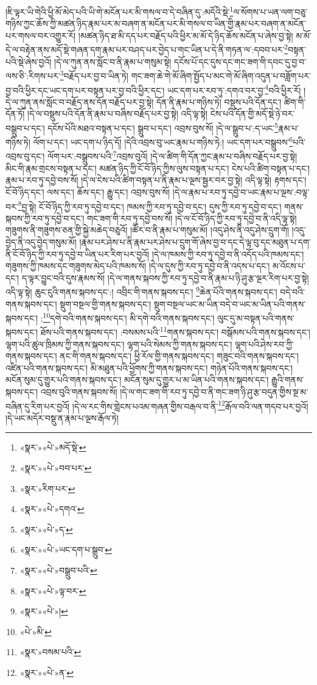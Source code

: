།ཇི་ལྟར་ཡི་གེའི་ཕྱི་མོ་མེད་པའི་ཡི་གེ་མངོན་པར་མི་གསལ་བ་དེ་བཞིན་དུ་:མདོའི་སྡེ་\footnote{«སྣར་»«པེ་»མདོ་སྡེ་}ལ་སོགས་པ་ཡན་ལག་བཅུ་གཉིས་ཀྱང་ཆོས་ཀྱི་མཚན་ཉིད་རྣམ་པར་མ་བཞག་ན་མངོན་པར་མི་གསལ་བ་ཡིན་གྱི་རྣམ་པར་བཞག་ན་མངོན་པར་གསལ་བར་འགྱུར་རོ། །མཚན་ཉིད་ཐ་མི་དད་པར་བརྗོད་པའི་ཕྱིར་མ་མོ་དེ་ཉིད་ཆོས་མངོན་པ་ཞེས་བྱ་སྟེ། མ་མོ་དེ་ལ་བརྟེན་ནས་མདོ་སྡེ་གཞན་དག་རྣམ་པར་བཤད་པར་བྱེད་པ་གང་ཡིན་པ་དེ་ནི་གཏན་ལ་:དབབ་པར་\footnote{«སྣར་»«པེ་»བབ་པར་}བསྟན་པའི་སྡེ་ཞེས་བྱའོ། །དེ་ལ་ཀུན་ནས་སློང་བ་ནི་རྣམ་པ་གསུམ་སྟེ། དངོས་པོ་དང་དུས་དང་གང་ཟག་གི་དབང་དུ་བྱ་བ་ལས་ཅི་:རིགས་པར་\footnote{«སྣར་»རིག་པར་}བརྗོད་པར་བྱ་བ་ཡིན་ཏེ། གང་ཟག་ཆེ་གེ་མོ་ཞིག་སྤྱོད་པ་མང་གེ་མོ་ཞིག་འདུན་པ་བཟློག་པར་བྱ་བའི་ཕྱིར་དང་ཡང་དག་པར་བསྟན་པར་བྱ་བའི་ཕྱིར་དང་། ཡང་དག་པར་རབ་ཏུ་:དགའ་བར་བྱ་\footnote{«སྣར་»«པེ་»དགའ་}བའི་ཕྱིར་རོ། །དེ་ལ་ཀུན་ནས་སློང་བ་བརྗོད་ནས་དོན་བརྗོད་པར་བྱ་སྟེ། དོན་ནི་རྣམ་པ་གཉིས་ཏེ། བསྡུས་པའི་དོན་དང་། ཚིག་གི་དོན་ཏོ། །དེ་ལ་བསྡུས་པའི་དོན་ནི་རྣམ་པ་བཞིས་བརྗོད་པར་བྱ་སྟེ། འདི་ལྟ་སྟེ། ངེས་པའི་དོན་གྱི་མདོ་སྡེ་ཉེ་བར་བསྒྲུབ་པ་དང་། དངོས་པོའི་མཐའ་བསྟན་པ་དང་། སྒྲུབ་པ་དང་། འབྲས་བུས་སོ། །དེ་ལ་སྒྲུབ་པ་:ད་ཡང་\footnote{«སྣར་»«པེ་»ད་}རྣམ་པ་གཉིས་ཏེ། ལོག་པ་དང་། ཡང་དག་པ་ཉིད་དོ། །དེའི་འབྲས་བུ་ཡང་རྣམ་པ་གཉིས་ཏེ:། ཡང་དག་པར་བསྒྲུབས་\footnote{«སྣར་»«པེ་»ཡང་དག་པ་སྒྲུབ་}པའི་འབྲས་བུ་དང་། ལོག་པར་:བསྒྲུབས་པའི་\footnote{«སྣར་»«པེ་»བསྒྲུབ་པའི་}འབྲས་བུའོ། །དེ་ལ་ཚིག་གི་དོན་ཀྱང་རྣམ་པ་བཞིས་བརྗོད་པར་བྱ་སྟེ། མིང་གི་རྣམ་གྲངས་བསྟན་པ་དང་། མཚན་ཉིད་ཀྱི་ངོ་བོ་ཉིད་ཀྱིས་ལུས་བསྟན་པ་དང་། ངེས་པའི་ཚིག་བསྟན་པ་དང་། རྣམ་པ་རབ་ཏུ་དབྱེ་བས་སོ། །དེ་ལ་ངེས་པའི་ཚིག་བསྟན་པ་ནི་རྣམ་པ་ལྔས་སྦྱར་བར་བྱ་སྟེ། འདི་ལྟ་སྟེ། རྟགས་དང་། ངོ་བོ་ཉིད་དང་། ལས་དང་། ཆོས་དང་། རྒྱུ་དང་། འབྲས་བུས་སོ། །དེ་ལ་རྣམ་པ་རབ་ཏུ་དབྱེ་བ་ཡང་རྣམ་པ་ལྔས་:བལྟ་བར་\footnote{«སྣར་»«པེ་»ལྟ་བར་}བྱ་སྟེ། ངོ་བོ་ཉིད་ཀྱི་རབ་ཏུ་དབྱེ་བ་དང་། ཁམས་ཀྱི་རབ་ཏུ་དབྱེ་བ་དང་། དུས་ཀྱི་རབ་ཏུ་དབྱེ་བ་དང་། གནས་སྐབས་ཀྱི་རབ་ཏུ་དབྱེ་བ་དང་། གང་ཟག་གི་རབ་ཏུ་དབྱེ་བས་སོ། །དེ་ལ་ངོ་བོ་ཉིད་ཀྱི་རབ་ཏུ་དབྱེ་བ་ནི་འདི་ལྟ་སྟེ། གཟུགས་ནི་གཟུགས་ཅན་གྱི་སྐྱེ་མཆེད་བཅུའོ། །ཚོར་བ་ནི་རྣམ་པ་གསུམ་མོ། །འདུ་ཤེས་ནི་འདུ་ཤེས་དྲུག་གོ། །འདུ་བྱེད་ནི་འདུ་བྱེད་གསུམ་མོ། །རྣམ་པར་ཤེས་པ་ནི་རྣམ་པར་ཤེས་པ་དྲུག་གོ་ཞེས་བྱ་བ་དང་དེ་ལྟ་བུ་དང་མཐུན་པ་དག་ནི་ངོ་བོ་ཉིད་ཀྱི་རབ་ཏུ་དབྱེ་བ་ཡིན་པར་རིག་པར་བྱའོ། །དེ་ལ་ཁམས་ཀྱི་རབ་ཏུ་དབྱེ་བ་ནི་འདོད་པའི་ཁམས་དང་། གཟུགས་ཀྱི་ཁམས་དང་གཟུགས་མེད་པའི་ཁམས་སོ། །དེ་ལ་དུས་ཀྱི་རབ་ཏུ་དབྱེ་བ་ནི་འདས་པ་དང་། མ་འོངས་པ་དང་། ད་ལྟར་བྱུང་བའི་དུས་རྣམས་སོ། །དེ་ལ་གནས་སྐབས་ཀྱི་རབ་ཏུ་དབྱེ་བ་ནི་རྣམ་པ་ཉི་ཤུ་རྩ་ལྔར་རིག་པར་བྱ་སྟེ། འདི་ལྟ་སྟེ། ཆུང་ངུའི་གནས་སྐབས་དང་:། འབྲིང་གི་གནས་སྐབས་དང་། \footnote{«སྣར་»«པེ་»།  }ཆེན་པོའི་གནས་སྐབས་དང་། བདེ་བའི་གནས་སྐབས་དང་། སྡུག་བསྔལ་གྱི་གནས་སྐབས་དང་། སྡུག་བསྔལ་ཡང་མ་ཡིན་བདེ་བ་ཡང་མ་ཡིན་པའི་གནས་སྐབས་དང་། :\footnote{«པེ་»མི་}དགེ་བའི་གནས་སྐབས་དང་། མི་དགེ་བའི་གནས་སྐབས་དང་། ལུང་དུ་མ་བསྟན་པའི་གནས་སྐབས་དང་། ཐོས་པའི་གནས་སྐབས་དང་། :བསམས་པའི་\footnote{«སྣར་»བསམ་པའི་}གནས་སྐབས་དང་། བསྒོམས་པའི་གནས་སྐབས་དང་། ལྷག་པའི་ཚུལ་ཁྲིམས་ཀྱི་གནས་སྐབས་དང་། ལྷག་པའི་སེམས་ཀྱི་གནས་སྐབས་དང་། ལྷག་པའི་ཤེས་རབ་ཀྱི་གནས་སྐབས་དང་། ནང་གི་གནས་སྐབས་དང་། ཕྱི་རོལ་གྱི་གནས་སྐབས་དང་། གཟུང་བའི་གནས་སྐབས་དང་། འཛིན་པའི་གནས་སྐབས་དང་། མི་མཐུན་པའི་ཕྱོགས་ཀྱི་གནས་སྐབས་དང་། གཉེན་པོའི་གནས་སྐབས་དང་། མངོན་སུམ་དུ་གྱུར་པའི་གནས་སྐབས་དང་། མངོན་སུམ་དུ་གྱུར་པ་མ་ཡིན་པའི་གནས་སྐབས་དང་། རྒྱུའི་གནས་སྐབས་དང་། འབྲས་བུའི་གནས་སྐབས་སོ། །དེ་ལ་གང་ཟག་གི་རབ་ཏུ་དབྱེ་བ་ནི་གང་ཟག་ཉི་ཤུ་རྩ་བདུན་གྱིས་སྔ་མ་བཞིན་དུ་རིག་པར་བྱའོ། །དེ་ལ་རང་གིས་གླེངས་པའམ་གཞན་གྱིས་བརྒལ་བ་ནི་\footnote{«སྣར་»«པེ་»ན་}རྒོལ་བའི་ལན་གདབ་པར་བྱའོ། །དེ་ཡང་མདོར་བསྡུ་ན་རྣམ་པ་ལྔས་རྒོལ་ཏེ། 